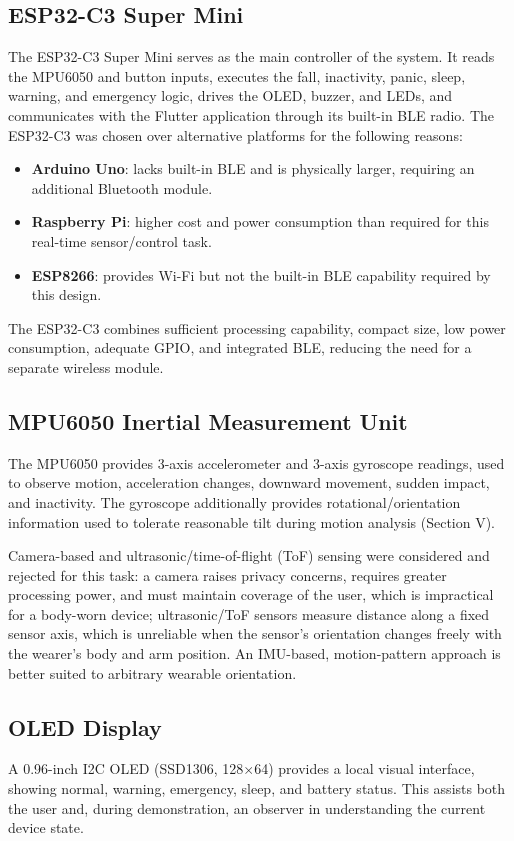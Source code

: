 \documentclass[lettersize,journal]{IEEEtran}
\begin{document}
\subsection{ESP32-C3 Super Mini}
The ESP32-C3 Super Mini serves as the main controller of the system. It reads the MPU6050 and button inputs, executes the fall, inactivity, panic, sleep, warning, and emergency logic, drives the OLED, buzzer, and LEDs, and communicates with the Flutter application through its built-in BLE radio. The ESP32-C3 was chosen over alternative platforms for the following reasons:
\begin{itemize}
\item \textbf{Arduino Uno}: lacks built-in BLE and is physically larger, requiring an additional Bluetooth module.
\item \textbf{Raspberry Pi}: higher cost and power consumption than required for this real-time sensor/control task.
\item \textbf{ESP8266}: provides Wi-Fi but not the built-in BLE capability required by this design.
\end{itemize}
The ESP32-C3 combines sufficient processing capability, compact size, low power consumption, adequate GPIO, and integrated BLE, reducing the need for a separate wireless module.

\subsection{MPU6050 Inertial Measurement Unit}
The MPU6050 provides 3-axis accelerometer and 3-axis gyroscope readings, used to observe motion, acceleration changes, downward movement, sudden impact, and inactivity. The gyroscope additionally provides rotational/orientation information used to tolerate reasonable tilt during motion analysis (Section V).

Camera-based and ultrasonic/time-of-flight (ToF) sensing were considered and rejected for this task: a camera raises privacy concerns, requires greater processing power, and must maintain coverage of the user, which is impractical for a body-worn device; ultrasonic/ToF sensors measure distance along a fixed sensor axis, which is unreliable when the sensor's orientation changes freely with the wearer's body and arm position. An IMU-based, motion-pattern approach is better suited to arbitrary wearable orientation.

\subsection{OLED Display}
A 0.96-inch I2C OLED (SSD1306, 128$\times$64) provides a local visual interface, showing normal, warning, emergency, sleep, and battery status. This assists both the user and, during demonstration, an observer in understanding the current device state.
\end{document}
